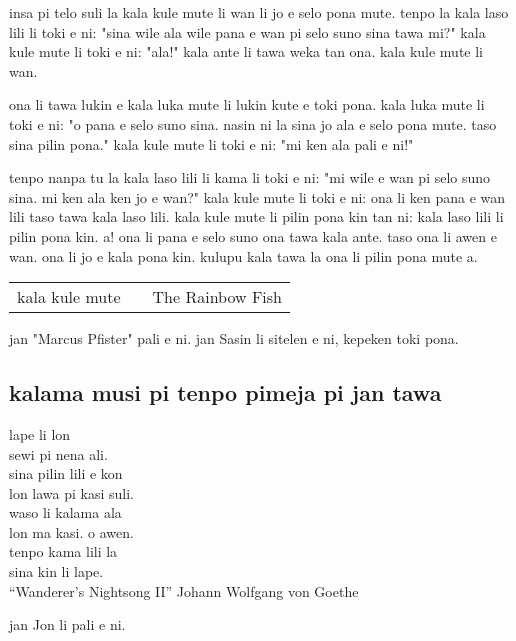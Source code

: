 insa pi telo suli la kala kule mute li wan li jo e selo pona mute.
tenpo la kala laso lili li toki e ni: "sina wile ala wile pana e wan pi selo suno sina tawa mi?"
kala kule mute li toki e ni: "ala!"
kala ante li tawa weka tan ona. kala kule mute li wan.

ona li tawa lukin e kala luka mute li lukin kute e toki pona.
kala luka mute li toki e ni: "o pana e selo suno sina. nasin ni la sina jo ala e selo pona mute. taso sina pilin pona."
kala kule mute li toki e ni: "mi ken ala pali e ni!"

tenpo nanpa tu la kala laso lili li kama li toki e ni: "mi wile e wan pi selo suno sina. mi ken ala ken jo e wan?"
kala kule mute li toki e ni: ona li ken pana e wan lili taso tawa kala laso lili.
kala kule mute li pilin pona kin tan ni: kala laso lili li pilin pona kin. a!
ona li pana e selo suno ona tawa kala ante. taso ona li awen e wan.
ona li jo e kala pona kin.
kulupu kala tawa la ona li pilin pona mute a.

\begin{supertabular}{p{5,5cm}|ll}
    kala kule mute &  & The Rainbow Fish \\
\end{supertabular}

jan "Marcus Pfister" pali e ni. jan Sasin li sitelen e ni, kepeken toki pona.

\newpage
\subsection{kalama musi pi tenpo pimeja pi jan tawa}

lape li lon \\
sewi pi nena ali. \\
sina pilin lili e kon \\
lon lawa pi kasi suli. \\
waso li kalama ala \\
lon ma kasi. o awen. \\
tenpo kama lili la \\
sina kin li lape. \\

``Wanderer's Nightsong II'' Johann Wolfgang von Goethe

jan Jon li pali e ni. \cite{www:janJon:01}
